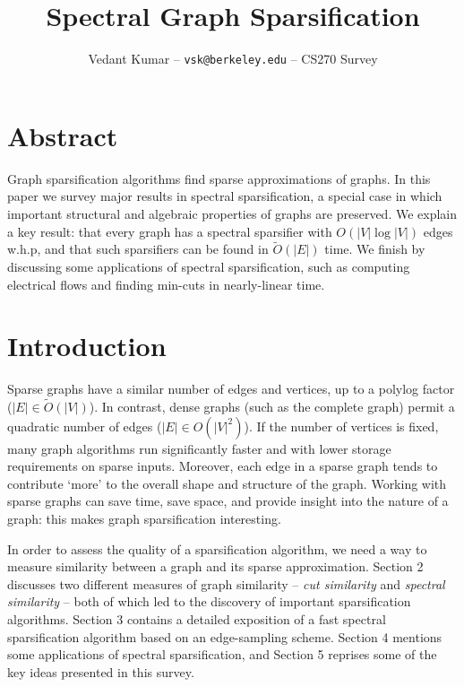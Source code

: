 \documentclass{article}
\title{Spectral Graph Sparsification}
\author{\small{Vedant Kumar -- \texttt{vsk@berkeley.edu} -- CS270 Survey}}
\begin{document}
\maketitle

\newcommand \cut[1]{\text{cut}_{#1}}
\newcommand \textlcsc[1]{\textsc{\MakeLowercase{#1}}}
\newcommand \Tr{\text{Tr}}

\section*{Abstract}

Graph sparsification algorithms find sparse approximations of graphs. In
this paper we survey major results in spectral sparsification, a special
case in which important structural and algebraic properties of graphs are
preserved. We explain a key result: that every graph has a spectral
sparsifier with $O(|V|\log|V|)$ edges w.h.p, and that such sparsifiers can
be found in $\tilde{O}(|E|)$ time. We finish by discussing some applications
of spectral sparsification, such as computing electrical flows and finding
min-cuts in nearly-linear time.

\section{Introduction}

Sparse graphs have a similar number of edges and vertices, up to a polylog
factor ($|E| \in \tilde{O}(|V|)$). In contrast, dense graphs (such as the
complete graph) permit a quadratic number of edges ($|E| \in O(|V|^2)$). If
the number of vertices is fixed, many graph algorithms run significantly
faster and with lower storage requirements on sparse inputs.  Moreover, each
edge in a sparse graph tends to contribute `more' to the overall shape and
structure of the graph.  Working with sparse graphs can save time, save
space, and provide insight into the nature of a graph: this makes graph
sparsification interesting.

In order to assess the quality of a sparsification algorithm, we need a way
to measure similarity between a graph and its sparse approximation. Section
2 discusses two different measures of graph similarity --
\textit{cut similarity} and \textit{spectral similarity} -- both of which
led to the discovery of important sparsification algorithms. Section 3
contains a detailed exposition of a fast spectral sparsification algorithm
based on an edge-sampling scheme.  Section 4 mentions some applications of
spectral sparsification, and Section 5 reprises some of the key ideas
presented in this survey.
\end{document}
